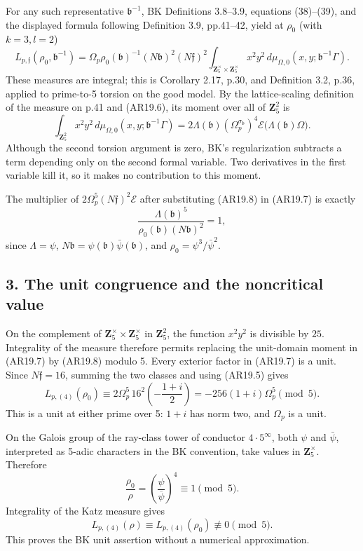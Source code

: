 \documentclass[11pt,a4paper]{article}
\begin{document}
For any such representative \(\mathfrak b^{-1}\), BK Definitions
3.8--3.9, equations (38)--(39), and the displayed formula following
Definition 3.9, pp.41--42, yield at \(\rho_0\) (with \(k=3,l=2\)) \[
L_{p,\mathfrak f}(\rho_0,\mathfrak b^{-1})
 =\Omega_p\rho_0(\mathfrak b)^{-1}(N\mathfrak b)^2(N\mathfrak f)^2
 \int_{\mathbf Z_5^\times\times\mathbf Z_5^\times}
       x^2y^2\,d\mu_{\Omega,0}(x,y;\mathfrak b^{-1}\Gamma).
\tag{AR19.7}
\] These measures are integral; this is Corollary 2.17, p.30, and
Definition 3.2, p.36, applied to prime-to-5 torsion on the good model.
By the lattice-scaling definition of the measure on p.41 and (AR19.6),
its moment over all of \(\mathbf Z_5^2\) is \[
\int_{\mathbf Z_5^2}x^2y^2\,d\mu_{\Omega,0}(x,y;\mathfrak b^{-1}\Gamma)
 =2\Lambda(\mathfrak b)
       (\Omega_p^{\sigma_{\mathfrak b}})^4
       \mathcal E\bigl(\Lambda(\mathfrak b)\Omega\bigr).
\tag{AR19.8}
\] Although the second torsion argument is zero, BK's regularization
subtracts a term depending only on the second formal variable. Two
derivatives in the first variable kill it, so it makes no contribution
to this moment.

The multiplier of \(2\Omega_p^5(N\mathfrak f)^2\mathcal E\) after
substituting (AR19.8) in (AR19.7) is exactly \[
\frac{\Lambda(\mathfrak b)^5}
 {\rho_0(\mathfrak b)(N\mathfrak b)^2}=1,
\tag{AR19.9}
\] since \(\Lambda=\psi\),
\(N\mathfrak b=\psi(\mathfrak b)\bar\psi(\mathfrak b)\), and
\(\rho_0=\psi^3/\bar\psi^2\).

\subsection{3. The unit congruence and the noncritical
value}\label{the-unit-congruence-and-the-noncritical-value}

On the complement of \(\mathbf Z_5^\times\times\mathbf Z_5^\times\) in
\(\mathbf Z_5^2\), the function \(x^2y^2\) is divisible by \(25\).
Integrality of the measure therefore permits replacing the unit-domain
moment in (AR19.7) by (AR19.8) modulo 5. Every exterior factor in
(AR19.7) is a unit. Since \(N\mathfrak f=16\), summing the two classes
and using (AR19.5) gives \[
L_{p,(4)}(\rho_0)
 \equiv2\Omega_p^5\,16^2
          \left(-\frac{1+i}{2}\right)
 =-256(1+i)\Omega_p^5\pmod5.
\tag{AR19.10}
\] This is a unit at either prime over 5: \(1+i\) has norm two, and
\(\Omega_p\) is a unit.

On the Galois group of the ray-class tower of conductor
\(4\cdot5^\infty\), both \(\psi\) and \(\bar\psi\), interpreted as
5-adic characters in the BK convention, take values in
\(\mathbf Z_5^\times\). Therefore \[
\frac{\rho_0}{\rho}
 =\left(\frac{\psi}{\bar\psi}\right)^4
 \equiv1\pmod5.
\tag{AR19.11}
\] Integrality of the Katz measure gives \[
L_{p,(4)}(\rho)\equiv L_{p,(4)}(\rho_0)\not\equiv0\pmod5.
\tag{AR19.12}
\] This proves the BK unit assertion without a numerical approximation.
\end{document}

